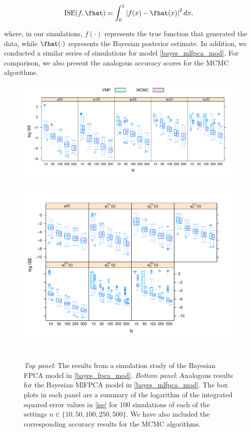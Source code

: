 \documentclass[ba]{imsart}
\numberwithin{equation}{section}
\theoremstyle{plain}
\begin{document}
\begin{equation}
	\text{ISE} (f, \fhat) = \int_0^1 \left| f (x) - \fhat(x) \right|^2 dx,
\label{ise}
\end{equation}

\noindent where, in our simulations, $f (\cdot)$ represents the true function that generated the data, while $\fhat (\cdot)$
represents the Bayesian posterior estimate. In addition, we conducted a similar series of
simulations for model \eqref{bayes_mlfpca_mod}. For comparison, we also present the analogous accuracy scores for
the MCMC algorithms.

\begin{figure}
	\centering
	\includegraphics[width = \textwidth]{images/box_plot_fpca_sims.pdf}
	\\
	\centering
	\includegraphics[height=3.6in]{images/box_plot_mlfpca_sims.pdf}
\caption{
	\emph{Top panel}: The results from a simulation study of the Bayesian FPCA model in
	\eqref{bayes_fpca_mod}. \emph{Bottom panel}: Analogous results for the Bayesian MlFPCA model in
	\eqref{bayes_mlfpca_mod}.
	The box plots in each panel are a summary of the logarithm of the
	integrated squared error values in \eqref{ise}
	for 100 simulations of each of the settings $n \in \{ 10, 50, 100, 250, 500 \}$. We have also included the
	corresponding accuracy results for the MCMC algorithms.
}
\label{fig:fpca_sims}
\end{figure}
\end{document}
